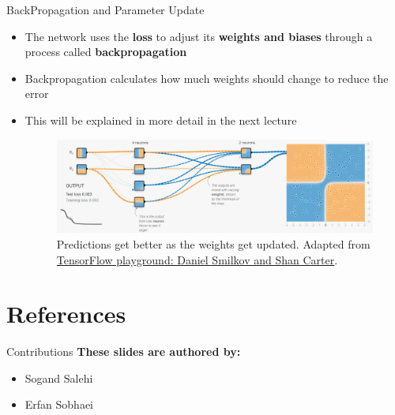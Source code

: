 \documentclass[serif, aspectratio=169]{beamer}
\begin{document}
\begin{frame}[t]{BackPropagation and Parameter Update}
    \begin{itemize}
        \item The network uses the \textbf{loss} to adjust its \textbf{weights and biases} through a process called \textbf{backpropagation}
        \item Backpropagation calculates how much weights should change to reduce the error
        \item This will be explained in more detail in the next lecture
        \begin{figure}[bh]
            \centering
            \includegraphics[width=\linewidth]{pic/4/tensorflow3.png} \\
            {\scriptsize Predictions get better as the weights get updated. Adapted from \href{playground.tensorflow.org}{TensorFlow playground: Daniel Smilkov and Shan Carter}.}
        \end{figure}
    \end{itemize}
\end{frame}


\section{References}

\begin{frame}{Contributions}
\textbf{These slides are authored by:}
    \begin{itemize}
        \item Sogand Salehi
        \item Erfan Sobhaei
    \end{itemize}
    
\end{frame}


\begin{frame}[allowframebreaks]
   \nocite{*} %
\end{frame}
\end{document}
